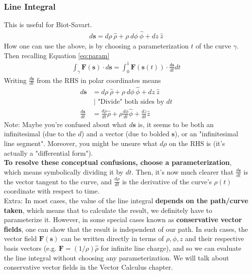 \documentclass{article}
\begin{document}
\subsubsection{Line Integral}
This is useful for Biot-Savart.
\begin{align}
{d\mathbf{s}} = d \rho\ \hat{{\rho}}+\rho\ d \phi \ \hat{{\phi}}+d z\ \hat{{z}}
\end{align}
How one can use the above, is by choosing a parameterization $t$ of the curve $\gamma$. Then recalling Equation \ref{eq:param}
\begin{align}
    \int_\gamma \mathbf{F}(\mathbf{s}) \cdot {d \mathbf{s}}=\int_0^1 \mathbf{F}(\mathbf{s}(t)) \cdot \frac{{d \mathbf{s}}}{d t} d t
\end{align}
Writing $\displaystyle \frac{d\mathbf{s}}{dt}$ from the RHS in polar coordinates means 
\begin{align}
{d\mathbf{s}} &= d \rho\ \hat{{\rho}}+\rho\ d \phi \ \hat{{\phi}}+d z\ \hat{{z}} \\ 
 &\  \bigg| \text{ "Divide" both sides by }dt\\
    \frac{d\mathbf{s}}{dt} &= \frac{d\rho}{dt} \hat{\rho} + \rho \frac{d\phi}{dt} \hat{\phi} + \frac{dz}{dt} \hat{z}
\end{align}
Note: Maybe you're confused about what $d\mathbf{s}$ is, it seems to be both an infinitesimal (due to the $d$) and a vector (due to bolded $\mathbf{s}$), or an "infinitesimal line segment". Moreover, you might be unsure what $d\rho$ on the RHS is (it's actually a "differential form"). \\[10pt]
\textbf{To resolve these conceptual confusions, choose a parameterization}, which means symbolically dividing it by $dt$. Then, it's now much clearer that $\displaystyle \frac{d\mathbf{s}}{dt}$ is the vector tangent to the curve, and $\displaystyle \frac{d\rho}{dt}$ is the derivative of the curve's $\rho(t)$ coordinate with respect to time.\\[10pt]
Extra: In most cases, the value of the line integral \textbf{depends on the path/curve taken}, which means that to calculate the result, we definitely have to parameterize it. However, in some special cases known as \textbf{conservative vector fields}, one can show that the result is independent of our path. In such cases, the vector field $\mathbf{F}(\mathbf{s})$ can be written directly in terms of $\rho, \phi, z$ and their respective basis vectors (e.g. $\mathbf{F} = (1/\rho) \hat{\rho}$ for infinite line charge), and so we can evaluate the line integral without choosing any parameterization. We will talk about conservative vector fields in the Vector Calculus chapter.
\end{document}
